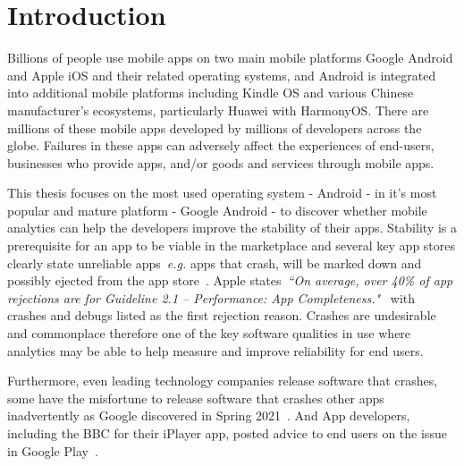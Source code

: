 \chapter{Introduction}
\label{the-introduction}

Billions of people use mobile apps on two main mobile platforms Google Android and Apple iOS and their related operating systems, and Android is integrated into additional mobile platforms including Kindle OS and various Chinese manufacturer's ecosystems, particularly Huawei with HarmonyOS. There are millions of these mobile apps developed by millions of developers across the globe. Failures in these apps can adversely affect the experiences of end-users, businesses who provide apps, and/or goods and services through mobile apps. 

This thesis focuses on the most used operating system - Android - in it's most popular and mature platform - Google Android - to discover whether mobile analytics can help the developers improve the stability of their apps. 
%
Stability is a prerequisite for an app to be viable in the marketplace and several key app stores clearly state unreliable apps~\emph{e.g.} apps that crash, will be marked down and possibly ejected from the app store~\citep{appleappstore2021_app_completeness, google_play_policy_center_broken_functionality, huaweidevelopers_appgallery_review_guidelines}. Apple states~\emph{``On average, over 40\% of app rejections are for Guideline 2.1 – Performance: App Completeness."}~\citep{appleappstore2021_review_avoiding_common_app_rejections} with crashes and debugs listed as the first rejection reason. Crashes are undesirable and commonplace therefore one of the key software qualities in use where analytics may be able to help measure and improve reliability for end users. 

Furthermore, even leading technology companies release software that crashes, some have the misfortune to release software that crashes other apps inadvertently as Google discovered in Spring 2021~\citep{bbcnews2021_google_fixes_crashing_android_app_issues}. And App developers, including the BBC for their iPlayer app, posted advice to end users on the issue in Google Play~\citep{bbc_iplayer_app_april_2021_webview_information}.

